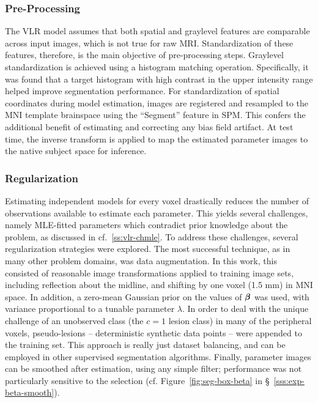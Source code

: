 \subsubsection{Pre-Processing}
The VLR model assumes that both spatial and graylevel features are comparable across input images,
which is not true for raw MRI.
Standardization of these features, therefore, is the main objective of pre-processing steps.
Graylevel standardization is achieved using a histogram matching operation.
Specifically, it was found that a target histogram with high contrast in the upper intensity range
helped improve segmentation performance.
For standardization of spatial coordinates during model estimation,
images are registered and resampled to the MNI template brainspace
using the ``Segment'' feature in SPM.
This confers the additional benefit of estimating and correcting any bias field artifact.
At test time, the inverse transform is applied to map the estimated parameter images
to the native subject space for inference.
\subsubsection{Regularization}
Estimating independent models for every voxel drastically reduces the number of observations
available to estimate each parameter.
This yields several challenges, namely MLE-fitted parameters which
contradict prior knowledge about the problem, as discussed in cf.~\ref{ss:vlr-chmle}.
To address these challenges, several regularization strategies were explored.
The most successful technique, as in many other problem domains, was data augmentation.
In this work, this consisted of reasonable image transformations
applied to training image sets, including
reflection about the midline,
and shifting by one voxel (1.5 mm) in MNI space.
In addition, a zero-mean Gaussian prior on the values of $\bm{\beta}$ was used,
with variance proportional to a tunable parameter $\lambda$.
In order to deal with the unique challenge of an unobserved class (the $c=1$ lesion class)
in many of the peripheral voxels,
pseudo-lesions -- deterministic synthetic data points --
were appended to the training set.
This approach is really just dataset balancing,
and can be employed in other supervised segmentation algorithms.
Finally, parameter images can be smoothed after estimation, using any simple filter;
performance was not particularly sensitive to the selection
(cf. Figure~\ref{fig:seg-box-beta} in \S~\ref{sss:exp-beta-smooth}).
